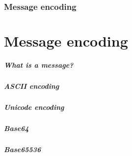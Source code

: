 \section[Section]{Message encoding}
\part{Message encoding}
\begin{frame}
	\partpage
	\centering
\end{frame}

\begin{frame}
  \frametitle{What is a message?}

\end{frame}

\begin{frame}
  \frametitle{ASCII encoding}

\end{frame}

\begin{frame}
  \frametitle{Unicode encoding}

\end{frame}

\begin{frame}
  \frametitle{Base64}

\end{frame}

\begin{frame}
  \frametitle{Base65536}

\end{frame}
